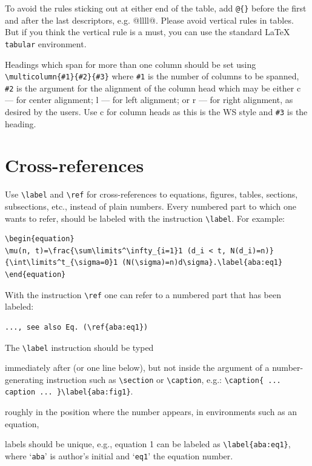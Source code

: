 \documentclass{ws-ijbc}
\begin{document}
To avoid the rules sticking out at either end
of the table, add \verb|@{}| before the first and after the last descriptors, e.g.
{@{}llll@{}}. Please avoid vertical rules in tables.
But if you think the vertical rule is a must,
you can use the standard \LaTeX{} \verb|tabular| environment.

Headings which span for more than one column should be set using
\verb|\multicolumn{#1}{#2}{#3}| where \verb|#1| is the number of
columns to be spanned, \verb|#2| is the argument for the alignment
of the column head which may be either {c} --- for center
alignment; {l} --- for left alignment; or {r} --- for right
alignment, as desired by the users. Use {c} for column heads as
this is the WS style and \verb|#3| is the heading.

\section{Cross-references}
Use \verb|\label| and \verb|\ref| for cross-references to
equations, figures, tables, sections, subsections, etc., instead
of plain numbers. Every numbered part to which one wants to refer,
should be labeled with the instruction \verb|\label|.
For example:
\begin{verbatim}
\begin{equation}
\mu(n, t)=\frac{\sum\limits^\infty_{i=1}1 (d_i < t, N(d_i)=n)}
{\int\limits^t_{\sigma=0}1 (N(\sigma)=n)d\sigma}.\label{aba:eq1}
\end{equation}
\end{verbatim}
With the instruction \verb|\ref| one can refer to a numbered part
that has been labeled:
\begin{verbatim}
..., see also Eq. (\ref{aba:eq1})
\end{verbatim}

The \verb|\label| instruction should be typed
\begin{itemlist}
\item immediately after (or one line below), but not inside the argument of
a number-generating instruction such as \verb|\section| or \verb|\caption|, e.g.:
\verb|\caption{ ... caption ... }\label{aba:fig1}|.
\item roughly in the position where the number appears, in environments
such as an equation,
\item labels should be unique, e.g., equation 1 can be labeled as
\verb|\label{aba:eq1}|, where `{\tt aba}' is author's initial and
`{\tt eq1}' the equation number.
\end{itemlist}
\end{document}
